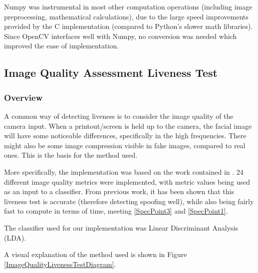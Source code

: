 \documentclass[10pt,a4paper]{article}
\begin{document}
            Numpy was instrumental in most other computation operations (including image preprocessing, mathematical calculations), due to the large speed improvements provided by the C implementation (compared to Python's slower math libraries).
            Since OpenCV interfaces well with Numpy, no conversion was needed which improved the ease of implementation.

        \subsection{Image Quality Assessment Liveness Test}
            \subsubsection{Overview}
            A common way of detecting liveness is to consider the image quality of the camera input. When a printout/screen is held up to the camera, the facial image
            will have some noticeable differences, specifically in the high frequencies. There might also be some image compression visible in fake images, compared to real ones.
            This is the basis for the method used.

            More specifically, the implementation was based on the work contained in \cite{ImageQualityAssessmentTest}. 24 different image quality metrics were implemented,
            with metric values being used as an input to a classifier. From previous work, it has been shown that this liveness test is accurate (therefore detecting spoofing well), while also being fairly fast to compute in terms of time, meeting \ref{SpecPoint3} and \ref{SpecPoint1}.

            The classifier used for our implementation was Linear Discriminant Analysis (LDA).

            A visual explanation of the method used is shown in Figure \ref{ImageQualityLivenessTestDiagram}.
\end{document}

